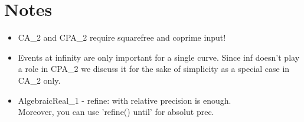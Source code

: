 \section{Notes}
\begin{itemize}
 \item CA\_2 and CPA\_2 require squarefree and coprime input! 
 \item Events at infinity are only important for a single curve. Since
   inf doesn't play a role in CPA\_2 we discuss it for the sake of
   simplicity as a special case in CA\_2 only. 
\item AlgebraicReal\_1 - refine: with relative precision is enough. \\
      Moreover, you can use 'refine() until' for absolut prec.
\end{itemize}

